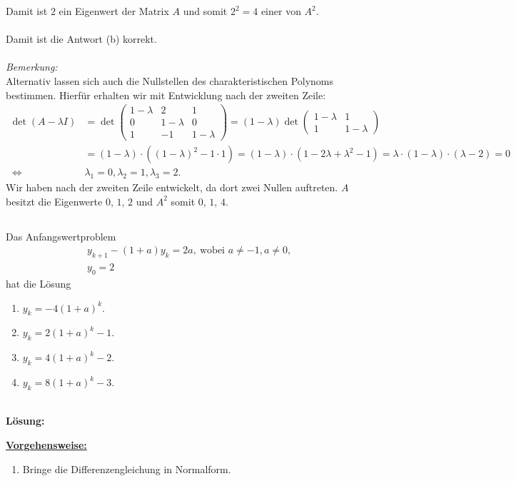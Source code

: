 Damit ist $ 2 $ ein Eigenwert der Matrix $ A $ und somit $ 2^2 = 4 $ einer von $ A^2 $.\\
\\
Damit ist die Antwort (b) korrekt.\\
\\
\textit{Bemerkung:}\\
Alternativ lassen sich auch die Nullstellen des charakteristischen Polynoms bestimmen. Hierfür erhalten wir mit Entwicklung nach der zweiten Zeile:
\begin{align*}
\det (A - \lambda I )
&= 
\det \begin{pmatrix}
1- \lambda & 2 & 1\\
0 & 1- \lambda & 0\\
1 & -1 & 1- \lambda
\end{pmatrix}
= (1- \lambda) \det \begin{pmatrix}
1- \lambda & 1\\
1 & 1 - \lambda
\end{pmatrix}\\
&= 
(1- \lambda) \cdot \left((1- \lambda)^2 - 1 \cdot 1\right)
=
(1- \lambda) \cdot ( 1 -2\lambda + \lambda^2 - 1)
=
\lambda \cdot (1 - \lambda) \cdot (\lambda - 2)
=0\\
\ \Leftrightarrow \
&\lambda_1 = 0, \lambda_2 = 1, \lambda_3 = 2.
\end{align*}
Wir haben nach der zweiten Zeile entwickelt, da dort zwei Nullen auftreten.
$ A $ besitzt die Eigenwerte $ 0 $, $ 1 $, $ 2 $ und $ A^2 $ somit $ 0 $, $ 1 $, $ 4 $.



\newpage

\subsection*{}
Das Anfangswertproblem
\begin{align*}
&y_{k+1} -(1+a) y_k = 2 a, \ \textrm{wobei } a \neq -1, a \neq 0,\\
&y_0 = 2
\end{align*}
hat die Lösung
\renewcommand{\labelenumi}{(\alph{enumi})}
\begin{enumerate}
	\item 
	$ y_k = -4 ( 1+a)^k $.
	\item
	$ y_k = 2 ( 1+a)^k  -1$.
	\item
	$ y_k = 4 ( 1+a)^k -2 $.
	\item
	$ y_k = 8 ( 1+a)^k -3$.
\end{enumerate}
\ \\
\textbf{Lösung:}
\begin{mdframed}
\underline{\textbf{Vorgehensweise:}}
\renewcommand{\labelenumi}{\theenumi.}
\begin{enumerate}
\item  Bringe die Differenzengleichung in Normalform.
\end{enumerate}
\end{mdframed}

